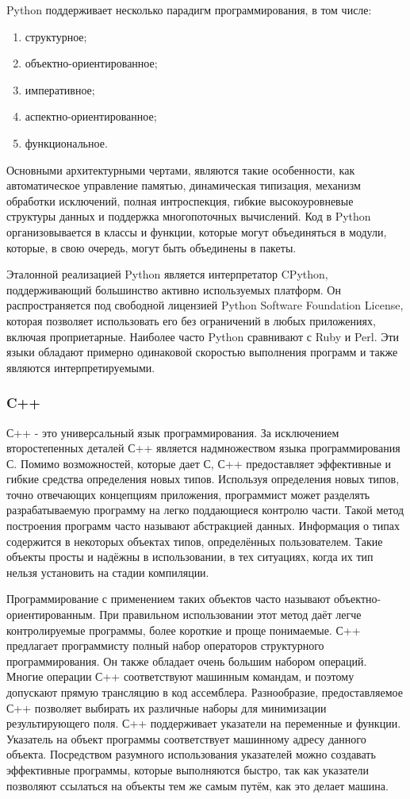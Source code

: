 Python поддерживает несколько парадигм программирования, в том числе:
\begin{enumerate}
	\item структурное;
	\item объектно-ориентированное;
	\item императивное;
	\item аспектно-ориентированное;
	\item функциональное.
\end{enumerate}
Основными архитектурными чертами, являются такие особенности, как автоматическое управление памятью, динамическая типизация, механизм обработки исключений, полная интроспекция, гибкие высокоуровневые структуры данных и поддержка многопоточных вычислений. 
Код в Python организовывается в классы и функции, которые могут объединяться в модули, которые, в свою очередь, могут быть объединены в пакеты. 

Эталонной реализацией Python является интерпретатор CPython, поддерживающий большинство активно используемых платформ. Он распространяется под свободной лицензией Python Software Foundation License, которая
позволяет использовать его без ограничений в любых приложениях, включая проприетарные. 
Наиболее часто Python сравнивают с Ruby и Perl. Эти языки обладают примерно одинаковой скоростью выполнения программ и также являются интерпретируемыми.

\subsubsection{C++}
С++ - это универсальный язык программирования. 
За исключением второстепенных деталей С++ является надмножеством языка программирования С. 
Помимо возможностей, которые дает С, С++ предоставляет эффективные и гибкие средства определения новых типов. Используя определения новых типов, точно отвечающих концепциям приложения, программист может разделять разрабатываемую программу на легко поддающиеся контролю части. 
Такой метод построения программ часто называют абстракцией данных.
Информация о типах содержится в некоторых объектах типов, определённых пользователем. 
Такие объекты просты и надёжны в использовании, в тех ситуациях, когда их тип нельзя установить на стадии компиляции.

Программирование с применением таких объектов часто называют объектно-ориентированным. 
При правильном использовании этот метод даёт легче контролируемые программы, более короткие и проще понимаемые. 
С++ предлагает программисту полный набор операторов структурного программирования. Он также обладает очень большим набором операций. 
Многие операции С++ соответствуют машинным командам, и поэтому допускают прямую трансляцию в код ассемблера. Разнообразие, предоставляемое С++ позволяет выбирать их различные наборы для минимизации результирующего поля. 
С++ поддерживает указатели на переменные и функции. 
Указатель на объект программы соответствует машинному адресу данного объекта. 
Посредством разумного использования указателей можно создавать эффективные программы, которые выполняются быстро, так как указатели позволяют ссылаться на объекты тем же самым путём, как это делает машина.

